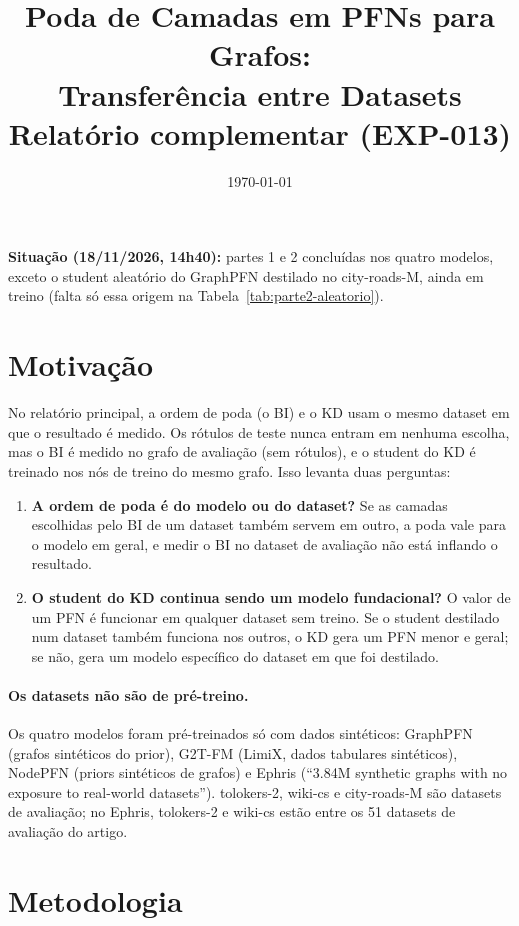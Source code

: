 \documentclass[12pt,a4paper]{article}
\title{Poda de Camadas em PFNs para Grafos:\\
Transferência entre Datasets\\
\large Relatório complementar (EXP-013)}
\author{}
\date{\today}
\begin{document}
\maketitle

\noindent\textbf{Situação (18/11/2026, 14h40):} partes 1 e 2 concluídas nos quatro modelos, exceto o student aleatório do GraphPFN destilado no city-roads-M, ainda em treino (falta só essa origem na Tabela~\ref{tab:parte2-aleatorio}).

\section{Motivação}

No relatório principal, a ordem de poda (o BI) e o KD usam o mesmo dataset em que o resultado é medido. Os rótulos de teste nunca entram em nenhuma escolha, mas o BI é medido no grafo de avaliação (sem rótulos), e o student do KD é treinado nos nós de treino do mesmo grafo. Isso levanta duas perguntas:

\begin{enumerate}
  \item \textbf{A ordem de poda é do modelo ou do dataset?} Se as camadas escolhidas pelo BI de um dataset também servem em outro, a poda vale para o modelo em geral, e medir o BI no dataset de avaliação não está inflando o resultado.
  \item \textbf{O student do KD continua sendo um modelo fundacional?} O valor de um PFN é funcionar em qualquer dataset sem treino. Se o student destilado num dataset também funciona nos outros, o KD gera um PFN menor e geral; se não, gera um modelo específico do dataset em que foi destilado.
\end{enumerate}

\paragraph{Os datasets não são de pré-treino.} Os quatro modelos foram pré-treinados só com dados sintéticos: GraphPFN (grafos sintéticos do prior), G2T-FM (LimiX, dados tabulares sintéticos), NodePFN (priors sintéticos de grafos) e Ephris (``3.84M synthetic graphs with no exposure to real-world datasets''). tolokers-2, wiki-cs e city-roads-M são datasets de avaliação; no Ephris, tolokers-2 e wiki-cs estão entre os 51 datasets de avaliação do artigo.

\section{Metodologia}
\end{document}
